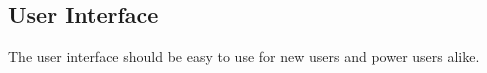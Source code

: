 \subsection{User Interface}
The user interface should be easy to use for new users and power users alike. 


